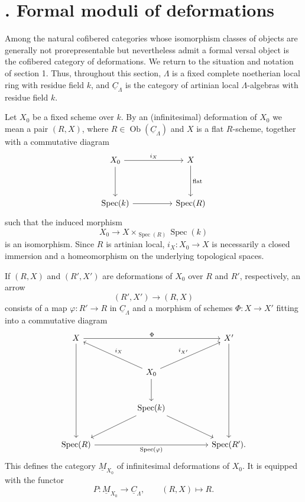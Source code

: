 
\section*{. Formal moduli of deformations}

Among the natural cofibered categories whose isomorphism classes of
objects are generally not prorepresentable but nevertheless admit a
formal versal object is the cofibered category of deformations. We
return to the situation and notation of section 1. Thus, throughout
this section, $\Lambda$ is a fixed complete noetherian local ring with
residue field $k$, and $\underline C_\Lambda$ is the category of
artinian local $\Lambda$-algebras with residue field $k$.

Let $X_0$ be a fixed scheme over $k$. By an (infinitesimal)
deformation of $X_0$ we mean a pair $(R,X)$, where
$R\in\operatorname{Ob}(\underline C_\Lambda)$ and $X$ is a flat
$R$-scheme, together with a commutative diagram
\[
\begin{tikzcd}[column sep=huge,row sep=huge]
X_0 \arrow[r,"i_X"] \arrow[d] & X \arrow[d,"\mathrm{flat}"] \\
\operatorname{Spec}(k) \arrow[r] & \operatorname{Spec}(R)
\end{tikzcd}
\]
such that the induced morphism
\[
 X_0\longrightarrow
 X\times_{\operatorname{Spec}(R)}\operatorname{Spec}(k)
\]
is an isomorphism. Since $R$ is artinian local,
$i_X:X_0\longrightarrow X$ is necessarily a closed immersion and a
homeomorphism on the underlying topological spaces.


If $(R,X)$ and $(R',X')$ are deformations of $X_0$ over $R$ and
$R'$, respectively, an arrow
\[
 (R',X')\longrightarrow(R,X)
\]
consists of a map $\varphi:R'\longrightarrow R$ in
$\underline C_\Lambda$ and a morphism of schemes
$\Phi:X\longrightarrow X'$ fitting into a commutative diagram
\[
\begin{tikzcd}[column sep=huge,row sep=large]
X \arrow[rr,"\Phi"] \arrow[ddd] && X' \arrow[ddd] \\
& X_0 \arrow[ul,"i_X"'] \arrow[ur,"i_{X'}"] \arrow[d] & \\
& \operatorname{Spec}(k) \arrow[dl] \arrow[dr] & \\
\operatorname{Spec}(R)
 \arrow[rr,"\operatorname{Spec}(\varphi)"']
&& \operatorname{Spec}(R').
\end{tikzcd}
\]
This defines the category $\underline M_{X_0}$ of infinitesimal
deformations of $X_0$. It is equipped with the functor
\[
 P:\underline M_{X_0}\longrightarrow\underline C_\Lambda,
 \qquad (R,X)\longmapsto R.
\]

